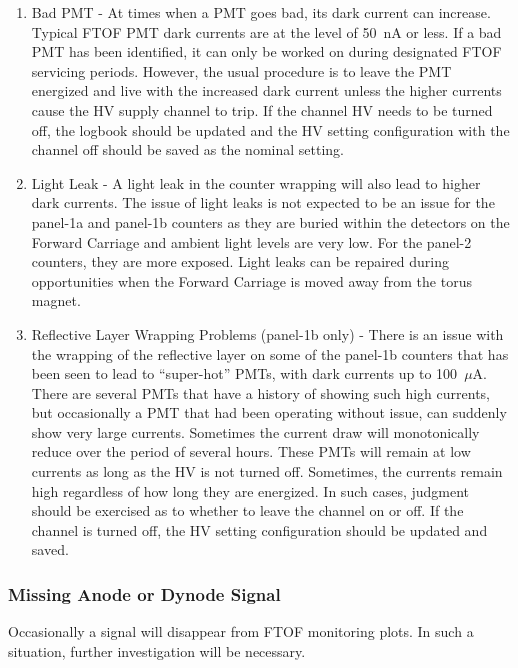 \documentclass[12pt]{article}
\begin{document}
\begin{enumerate}
\item Bad PMT - At times when a PMT goes bad, its dark current can increase. Typical FTOF PMT dark 
currents are at the level of 50~nA or less. If a bad PMT has been identified, it can only be worked 
on during designated FTOF servicing periods. However, the usual procedure is to leave the PMT 
energized and live with the increased dark current unless the higher currents cause the HV supply 
channel to trip. If the channel HV needs to be turned off, the logbook should be updated and the HV 
setting configuration with the channel off should be saved as the nominal setting.
\item Light Leak - A light leak in the counter wrapping will also lead to higher dark currents. The 
issue of light leaks is not expected to be an issue for the panel-1a and panel-1b counters as they 
are buried within the detectors on the Forward Carriage and ambient light levels are very low. For 
the panel-2 counters, they are more exposed. Light leaks can be repaired during opportunities when 
the Forward Carriage is moved away from the torus magnet.
\item Reflective Layer Wrapping Problems (panel-1b only) - There is an issue with the wrapping of 
the reflective layer on some of the panel-1b counters that has been seen to lead to ``super-hot'' PMTs, 
with dark currents up to 100~$\mu$A. There are several PMTs that have a history of showing such high 
currents, but occasionally a PMT that had been operating without issue, can suddenly show very large 
currents. Sometimes the current draw will monotonically reduce over the period of several hours. These 
PMTs will remain at low currents as long as the HV is not turned off. Sometimes, the currents remain 
high regardless of how long they are energized. In such cases, judgment should be exercised as to 
whether to leave the channel on or off. If the channel is turned off, the HV setting configuration 
should be updated and saved.
\end{enumerate}

\subsubsection{Missing Anode or Dynode Signal}
\label{missing}

Occasionally a signal will disappear from FTOF monitoring plots. In such a situation, further
investigation will be necessary. 
\end{document}
